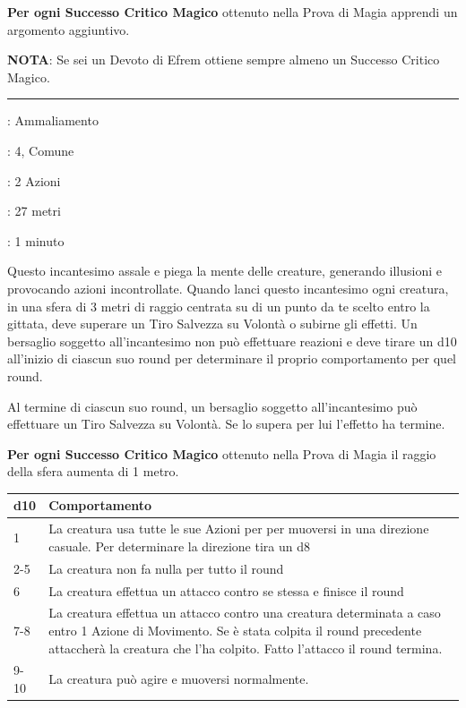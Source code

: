 \begin{multicols}{2}
\textbf{Per ogni Successo Critico Magico} ottenuto nella Prova di Magia apprendi un argomento aggiuntivo.

\textbf{NOTA}: Se sei un Devoto di Efrem ottiene sempre almeno un Successo Critico Magico.

\smallskip\noindent\rule{\linewidth}{2pt} \hypertarget{Confusione}{}\smallskip{}\hypertarget{incconfusione}{}\label{incconfusione}
\noindent
\begin{description}[noitemsep, topsep=0pt, parsep=0pt, partopsep=0pt, leftmargin=0cm, labelwidth=1.3cm]
	\item[\textbf{Lista}]: Ammaliamento
	\item[\textbf{Livello}]: 4, Comune
	\item[\textbf{Lancio}]: 2 Azioni
	\item[\textbf{Gittata}]: 27 metri
	\item[\textbf{Durata}]: 1 minuto
\end{description}

Questo incantesimo assale e piega la mente delle creature, generando illusioni e provocando azioni incontrollate. Quando lanci questo incantesimo ogni creatura, in una sfera di 3 metri di raggio centrata su di un punto da te scelto entro la gittata, deve superare un Tiro Salvezza su Volontà o subirne gli effetti. Un bersaglio soggetto all'incantesimo non può effettuare reazioni e deve tirare un d10 all'inizio di ciascun suo round per determinare il proprio comportamento per quel round.

Al termine di ciascun suo round, un bersaglio soggetto all'incantesimo può effettuare un Tiro Salvezza su Volontà. Se lo supera per lui l'effetto ha termine.

\textbf{Per ogni Successo Critico Magico} ottenuto nella Prova di Magia il raggio della sfera aumenta di 1 metro.

\medskip

\noindent\begin{tabularx}{\linewidth}{lX}
	\toprule
	d10 & Comportamento\\
	\toprule
	1 & La creatura usa tutte le sue Azioni per per muoversi in una direzione casuale. Per determinare la direzione tira un d8\\
	2-5 & La creatura non fa nulla per tutto il round\\
	6 & La creatura effettua un attacco contro se stessa e finisce il round\\
	7-8 & La creatura effettua un attacco contro una creatura determinata a caso entro 1 Azione di Movimento. Se è stata colpita il round precedente attaccherà la creatura che l'ha colpito. Fatto l'attacco il round termina.\\
	9-10 & La creatura può agire e muoversi normalmente.
\end{tabularx}


\end{multicols}
